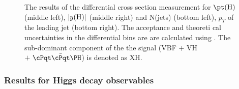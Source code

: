 \begin{figure}[!htb]
{%
                The results of the differential cross section measurement for $\pt({\rm H})$ (middle left), $|y({\rm H})|$ (middle right) and N(jets) (bottom left), $p_T$ of the leading jet (bottom right). The acceptance and theoreti
cal uncertainties in the differential bins are are calculated using \POWHEG. 
                The sub-dominant component of the the signal (VBF $+$ VH $+~\ttH$) is denoted as XH. 
                \label{fig:fiducialresult}}
\end{figure}



\subsubsection{Results for Higgs decay observables}



